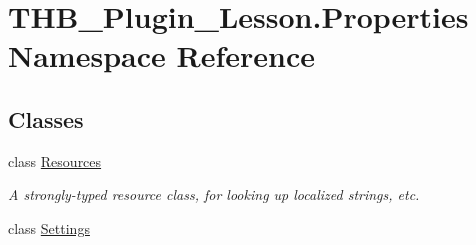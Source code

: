 \hypertarget{namespace_t_h_b___plugin___lesson_1_1_properties}{}\section{T\+H\+B\+\_\+\+Plugin\+\_\+\+Lesson.\+Properties Namespace Reference}
\label{namespace_t_h_b___plugin___lesson_1_1_properties}
\subsection*{Classes}
\begin{DoxyCompactItemize}
\item 
class \mbox{\hyperlink{class_t_h_b___plugin___lesson_1_1_properties_1_1_resources}{Resources}}
\begin{DoxyCompactList}\small\item\em A strongly-\/typed resource class, for looking up localized strings, etc. \end{DoxyCompactList}\item 
class \mbox{\hyperlink{class_t_h_b___plugin___lesson_1_1_properties_1_1_settings}{Settings}}
\end{DoxyCompactItemize}
